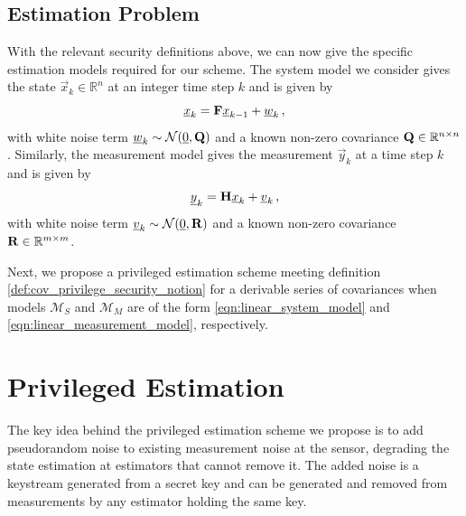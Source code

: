 \documentclass[letterpaper, 10 pt, conference]{ieeeconf}
\begin{document}
\subsection{Estimation Problem}
With the relevant security definitions above, we can now give the specific estimation models required for our scheme. The system model we consider gives the state $\vec{x}_k\in\mathbb{R}^n$ at an integer time step $k$ and is given by
\begin{equation}\label{eqn:linear_system_model}
   {\underline{x}}_k = {{\mathbf{F}}}{\underline{x}}_{k-1} + {\underline{w}}_k\,,
\end{equation}
with white noise term ${\underline{w}}_k\sim \mathcal{N}({\underline{0}}, {{\mathbf{Q}}})$ and a known non-zero covariance ${{\mathbf{Q}}}\in \mathbb{R}^{n\times n}$. Similarly, the measurement model gives the measurement $\vec{y}_k$ at a time step $k$ and is given by
\begin{equation}\label{eqn:linear_measurement_model}
   {\underline{y}}_k = {{\mathbf{H}}}{\underline{x}}_k + {\underline{v}}_k\,,
\end{equation}
with white noise term ${\underline{v}}_k\sim \mathcal{N}({\underline{0}}, {{\mathbf{R}}})$ and a known non-zero covariance ${{\mathbf{R}}}\in \mathbb{R}^{m\times m}$.

Next, we propose a privileged estimation scheme meeting definition \ref{def:cov_privilege_security_notion} for a derivable series of covariances when models $\mathcal{M}_S$ and $\mathcal{M}_M$ are of the form \eqref{eqn:linear_system_model} and \eqref{eqn:linear_measurement_model}, respectively.

% 
%                                                                                
%                                                                                
%                                                                                
% 

\section{Privileged Estimation}\label{sec:priv_estimation}
The key idea behind the privileged estimation scheme we propose is to add pseudorandom noise to existing measurement noise at the sensor, degrading the state estimation at estimators that cannot remove it. The added noise is a keystream generated from a secret key and can be generated and removed from measurements by any estimator holding the same key.
\end{document}
